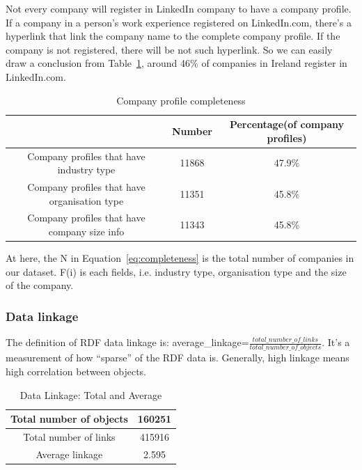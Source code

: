Not every company will register in LinkedIn company to have a company profile. If a company in a person's work experience registered on LinkedIn.com, there's a hyperlink that link the company name to the complete company profile. If the company is not registered, there will be not such hyperlink. So we can easily draw a conclusion from Table~\ref{tab:comPercent}, around 46\% of companies in Ireland register in LinkedIn.com.

\begin{table}[H]
    \begin{tabular}{|c|c|c|}
    \hline
    ~                                            & Number & Percentage(of company profiles) \\ \hline
    Company profiles that have industry type     & 11868  & 47.9\%                             \\ \hline
    Company profiles that have organisation type & 11351  & 45.8\%                             \\ \hline
    Company profiles that have company size info & 11343  & 45.8\%                             \\ \hline
    \end{tabular}
    \caption{Company profile completeness}
    \label{tab:comPercent}
\end{table}

At here, the N in Equation~\ref{eq:completeness} is the total number of companies in our dataset. F(i) is each fields, i.e. industry type, organisation type and the size of the company.

\subsubsection{Data linkage}

The definition of RDF data linkage is: average\_linkage=$\frac{total\_number\_of\_links}{total\_number\_of\_objects}$. It's a measurement of how ``sparse'' of the RDF data is. Generally, high linkage means high correlation between objects.

\begin{table}[H]
    \begin{tabular}{|c|c|}
    \hline
    Total number of objects & 160251 \\ \hline
    Total number of links   & 415916 \\ \hline
    Average linkage                 & 2.595  \\ \hline
    \end{tabular}
    \caption{Data Linkage: Total and Average}
    \label{tab:linkage}
\end{table}

